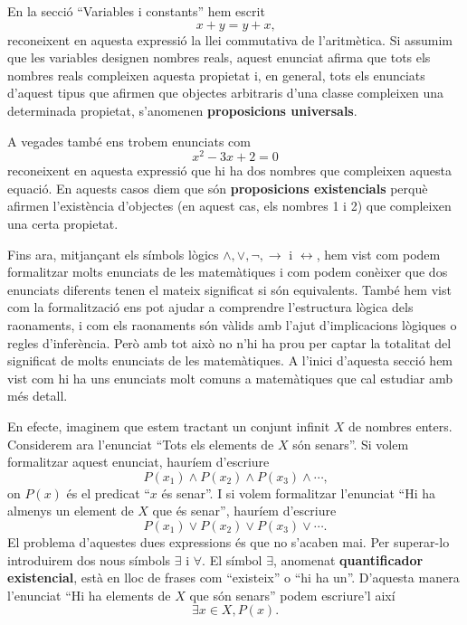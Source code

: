 En la secció \enquote{Variables i constants} hem escrit
\begin{equation*}
x+y=y+x\text{,}
\end{equation*}
reconeixent en aquesta expressió la llei commutativa de l'aritmètica. Si assumim que les variables designen nombres reals, aquest enunciat
afirma que tots els nombres reals compleixen aquesta propietat i, en
general, tots els enunciats d'aquest tipus que afirmen que objectes
arbitraris d'una classe compleixen una determinada propietat, s'anomenen
\textbf{proposicions universals}.

A vegades també ens trobem enunciats com\begin{equation*}
x^{2}-3x+2=0
\end{equation*}
reconeixent en aquesta expressió que hi ha dos nombres que compleixen
aquesta equació. En aquests casos diem que són \textbf{proposicions
existencials} perquè afirmen l'existència d'objectes (en aquest cas,
els nombres 1 i 2) que compleixen una certa propietat.

\bigskip

Fins ara, mitjançant els símbols lògics $\wedge,\vee
,\lnot,\longrightarrow$ i $\longleftrightarrow$, hem vist com podem
formalitzar molts enunciats de les matemàtiques i com podem conèixer
que dos enunciats diferents tenen el mateix significat si són
equivalents. També hem vist com la formalització ens pot ajudar a
comprendre l'estructura lògica dels raonaments, i com els raonaments són vàlids amb l'ajut d'implicacions lògiques o regles d'inferència. Però amb tot això no n'hi ha prou per captar la totalitat
del significat de molts enunciats de les matemàtiques. A l'inici
d'aquesta secció hem vist com hi ha uns enunciats molt comuns a matemàtiques que cal estudiar amb més detall.

\bigskip

En efecte, imaginem que estem tractant un conjunt infinit $X$ de nombres
enters. Considerem ara l'enunciat \enquote{Tots els elements de $X$ són senars}.
Si volem formalitzar aquest enunciat, hauríem d'escriure\begin{equation*}
P(x_{1})\wedge P(x_{2})\wedge P(x_{3})\wedge\cdots\text{,}
\end{equation*}
on $P(x)$ és el predicat \enquote{$x$ és senar}. I si volem formalitzar
l'enunciat \enquote{Hi ha almenys un element de $X$ que és senar}, hauríem
d'escriure\begin{equation*}
P(x_{1})\vee P(x_{2})\vee P(x_{3})\vee\cdots\text{.}
\end{equation*}
El problema d'aquestes dues expressions és que no s'acaben mai. Per
superar-lo introduirem dos nous símbols $\exists$ i $\forall$. El símbol $\exists$, anomenat \textbf{quantificador existencial}, està
en lloc de frases com \enquote{existeix} o \enquote{hi ha un}. D'aquesta manera l'enunciat
\enquote{Hi ha elements de $X$ que són senars} podem escriure'l així\begin{equation*}
\exists x\in X,P(x)\text{.}
\end{equation*}

